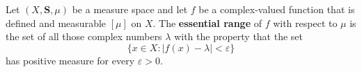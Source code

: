 Let $(X, \mathbf{S}, \mu)$ be a measure space and let $f$ be a complex-valued function that is defined and measurable $[\mu]$ on $X$. The \textbf{essential range} of $f$ with respect to $\mu$ is the set of all those complex numbers $\lambda$ with the property that the set
$$\{x \in X : |f(x) - \lambda| < \varepsilon\}$$
has positive measure for every $\varepsilon > 0$.
